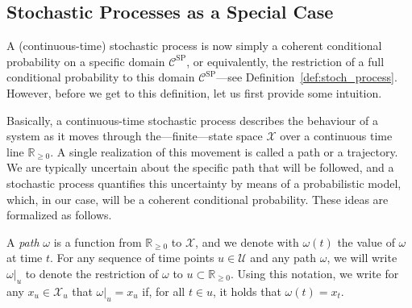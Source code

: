 \documentclass[10pt,a4paper]{paper}
\theoremstyle{definition}
\newcommand{\reals}{\mathbb{R}}
\newcommand{\realsnonneg}{\reals_{\geq 0}}
\newcommand{\states}{\mathcal{X}}
\begin{document}
\subsection{Stochastic Processes as a Special Case}\label{sec:def_stochastic_processes}

A (continuous-time) stochastic process is now simply a coherent conditional probability on a specific domain $\mathcal{C}^\mathrm{SP}$, or equivalently, the restriction of a full conditional probability to this domain $\mathcal{C}^\mathrm{SP}$---see Definition~\ref{def:stoch_process}. However, before we get to this definition, let us first provide some intuition.



Basically, a continuous-time stochastic process describes the behaviour of a system as it moves through the---finite---state space $\states$ over a continuous time line $\realsnonneg$. A single realization of this movement is called a path or a trajectory. We are typically uncertain about the specific path that will be followed, and a stochastic process quantifies this uncertainty by means of a probabilistic model, which, in our case, will be a coherent conditional probability. These ideas are formalized as follows.


A \emph{path} $\omega$ is a function from $\realsnonneg$ to $\states$, and we denote with $\omega(t)$ the value of $\omega$ at time $t$. For any sequence of time points $u\in\mathcal{U}$ and any path $\omega$, we will write $\omega\vert_{u}$ to denote the restriction of $\omega$ to $u\subset\realsnonneg$. Using this notation, we write for any $x_u\in\states_u$ that $\omega\vert_u=x_u$ if, for all $t\in u$, it holds that $\omega(t)=x_{t}$.%
\end{document}
